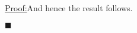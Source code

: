 \documentclass[12pt]{article}
\newenvironment{claimproof}[1]{\par\noindent\underline{Proof:}\space#1}{\hfill $\blacksquare$}
\numberwithin{claim}{section}
\numberwithin{lemma}{section}
\numberwithin{theorem}{section}
\begin{document}
\begin{claimproof}
And hence the result follows.
%
%
%
%
%
%

\end{claimproof}
\end{document}
